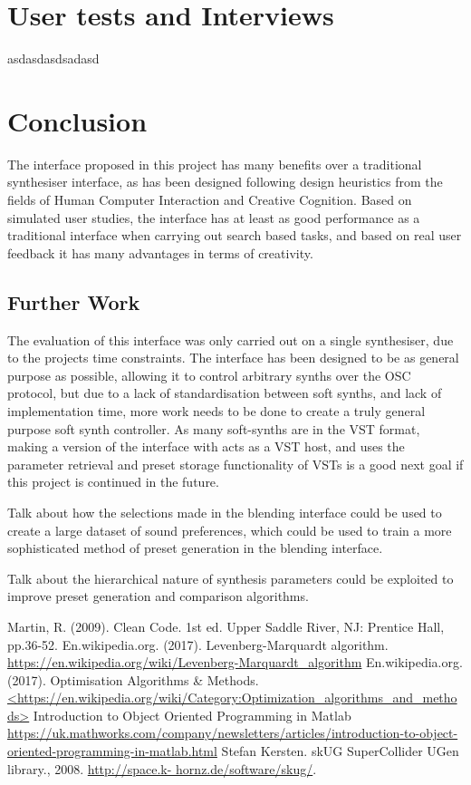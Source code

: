 \documentclass[11pt, oneside]{report}   	%
\begin{document}
\chapter{User tests and Interviews}
asdasdasdsadasd

\chapter{Conclusion}
The interface proposed in this project has many benefits over a traditional synthesiser interface, as has been designed following design heuristics from the fields of Human Computer Interaction and Creative Cognition. Based on simulated user studies, the interface has at least as good performance as a traditional interface when carrying out search based tasks, and based on real user feedback it has many advantages in terms of creativity.
\section{Further Work}
The evaluation of this interface was only carried out on a single synthesiser, due to the projects time constraints. The interface has been designed to be as general purpose as possible, allowing it to control arbitrary synths over the OSC protocol, but due to a lack of standardisation between soft synths, and lack of implementation time, more work needs to be done to create a truly general purpose soft synth controller. As many soft-synths are in the VST format, making a version of the interface with acts as a VST host, and uses the parameter retrieval and preset storage functionality of VSTs is a good next goal if this project is continued in the future.

Talk about how the selections made in the blending interface could be used to create a large dataset of sound preferences, which could be used to train a more sophisticated method of preset generation in the blending interface.

Talk about the hierarchical nature of synthesis parameters could be exploited to improve preset generation and comparison algorithms. 
\begin{thebibliography}{9}
\singlespacing
{}
Martin, R. (2009). Clean Code. 1st ed. Upper Saddle River, NJ: Prentice Hall, pp.36-52.
En.wikipedia.org. (2017). Levenberg-Marquardt algorithm. \\
\url{https://en.wikipedia.org/wiki/Levenberg-Marquardt_algorithm}
En.wikipedia.org. (2017). Optimisation Algorithms \& Methods.
\url{<https://en.wikipedia.org/wiki/Category:Optimization_algorithms_and_methods>}
Introduction to Object Oriented Programming in Matlab\\
\url{https://uk.mathworks.com/company/newsletters/articles/introduction-to-object-oriented-programming-in-matlab.html}
Stefan Kersten. skUG SuperCollider UGen library., 2008. \url{http://space.k- hornz.de/software/skug/}.
\end{thebibliography}
\end{document}
